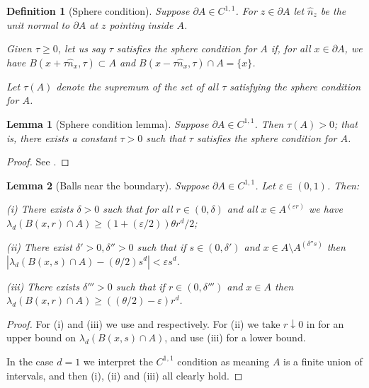 \documentclass[12pt]{article}
\newcommand{\eps}{\varepsilon}
\newtheorem{lemm}{Lemma}
\newtheorem{defn}{Definition}
\begin{document}
\begin{defn}[Sphere condition]
	Suppose $\partial A \in C^{1,1}$.
        For $z \in \partial A$ let $\hat n_z$ be the unit normal to $\partial A$ at $z$ pointing inside $A$.

        Given $\tau \geq 0$,
        let us say $\tau $ satisfies the {\em sphere condition}
         for $A$ if, for all $x \in \partial A$,
        we have $B(x+ \tau \hat n_x , \tau) \subset A$
        and  $B(x -\tau \hat n_x, \tau) \cap A = \{x\}$.

Let $\tau(A)$ denote the supremum of the set of all $\tau$ satisfying
the sphere condition for $A$.
\end{defn}
\begin{lemm}[Sphere condition lemma]
	Suppose $\partial A \in C^{1,1}$. Then
        $\tau(A) >0$; that is,
        there exists a constant $\tau >0$ such that
        $\tau$ satisfies the sphere condition
         for $A$.
\end{lemm}
\begin{proof}
        See     \cite[Lemma 7]{sphere-condition-lp}.
\end{proof}

\begin{lemm}[Balls near the boundary]
	\label{l:bdyballs}
	Suppose $\partial A \in C^{1,1}$.  Let $\eps \in (0,1)$.  Then:
	
	(i) There exists $\delta >0$ such that
	for all $r \in (0,\delta)$
	and all $x \in A^{(\eps r)}$
	we have $\lambda_d(B(x,r) \cap A) \geq (1+(\eps/2)) \theta r^d/2$;
	
	(ii)  There exist $\delta' >0, \delta'' >0$ such that if
	$s \in (0, \delta')$ and
	$x \in A \setminus A^{(\delta''s)}$
	then $|\lambda_d(B(x,s) \cap A) -  (\theta/2) s^d|
	< \eps s^d$.

	(iii)
	There exists $\delta''' > 0$ such that if $r \in (0, \delta''')$
	and $x \in A$ then $\lambda_d(B(x,r) \cap A)
	\geq ((\theta/2) - \eps) r^d$.
\end{lemm}
	\begin{proof}
		For (i) and (iii) we use \cite[Lemma 2.3(i)]{PYconnect} 
		and \cite[Lemma 2.4(i)]{PYconnect} respectively.
		For (ii) we take $r \downarrow 0$ in
		\cite[Lemma 2.3(ii)]{PYconnect}
		for an upper bound
		on $\lambda_d(B(x,s) \cap A)$, and use (iii)
		for a lower bound.

		In the case $d=1$ we interpret the $C^{1,1}$ condition
		as meaning $A$ is a finite union of intervals, and
		then  (i), (ii) and (iii) all clearly hold.
	\end{proof}
\end{document}
